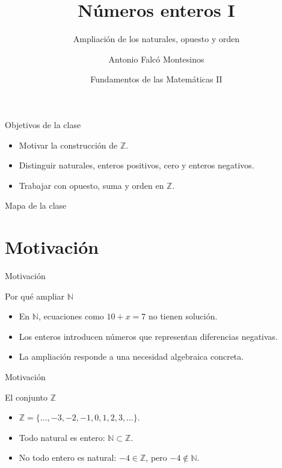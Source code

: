 \documentclass[aspectratio=169,11pt]{beamer}
\title[FdM II -- Clase 01]{Números enteros I}
\subtitle{Ampliación de los naturales, opuesto y orden}
\author{Antonio Falcó Montesinos}
\institute{Universidad CEU Cardenal Herrera}
\date{Fundamentos de las Matemáticas II}
\begin{document}
\begin{frame}
  \titlepage
\end{frame}

\begin{frame}{Objetivos de la clase}
\begin{itemize}
  \item Motivar la construcción de \(\mathbb{Z}\).
  \item Distinguir naturales, enteros positivos, cero y enteros negativos.
  \item Trabajar con opuesto, suma y orden en \(\mathbb{Z}\).
\end{itemize}
\end{frame}

\begin{frame}{Mapa de la clase}
\tableofcontents
\end{frame}

\section{Motivación}

\begin{frame}{Motivación}
\begin{block}{Por qué ampliar \(\mathbb{N}\)}
\begin{itemize}
  \item En \(\mathbb{N}\), ecuaciones como \(10+x=7\) no tienen solución.
  \item Los enteros introducen números que representan diferencias negativas.
  \item La ampliación responde a una necesidad algebraica concreta.
\end{itemize}
\end{block}
\end{frame}

\begin{frame}{Motivación}
\begin{block}{El conjunto \(\mathbb{Z}\)}
\begin{itemize}
  \item \(\mathbb{Z}=\{\ldots,-3,-2,-1,0,1,2,3,\ldots\}\).
  \item Todo natural es entero: \(\mathbb{N}\subset\mathbb{Z}\).
  \item No todo entero es natural: \(-4\in\mathbb{Z}\), pero \(-4\notin\mathbb{N}\).
\end{itemize}
\end{block}
\end{frame}
\end{document}
